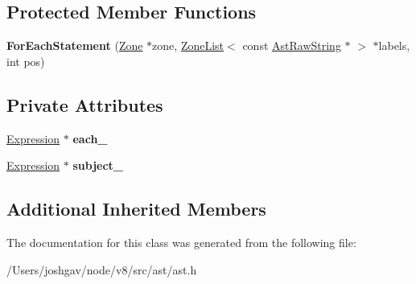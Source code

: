 \subsection*{Protected Member Functions}
\begin{DoxyCompactItemize}
\item 
{\bfseries For\+Each\+Statement} (\hyperlink{classv8_1_1internal_1_1_zone}{Zone} $\ast$zone, \hyperlink{classv8_1_1internal_1_1_zone_list}{Zone\+List}$<$ const \hyperlink{classv8_1_1internal_1_1_ast_raw_string}{Ast\+Raw\+String} $\ast$ $>$ $\ast$labels, int pos)\hypertarget{classv8_1_1internal_1_1_for_each_statement_abf06e12eaae648e6f694c45e1d8e60c9}{}\label{classv8_1_1internal_1_1_for_each_statement_abf06e12eaae648e6f694c45e1d8e60c9}

\end{DoxyCompactItemize}
\subsection*{Private Attributes}
\begin{DoxyCompactItemize}
\item 
\hyperlink{classv8_1_1internal_1_1_expression}{Expression} $\ast$ {\bfseries each\+\_\+}\hypertarget{classv8_1_1internal_1_1_for_each_statement_aa12808d96f7342cf636a60c3d6f512a1}{}\label{classv8_1_1internal_1_1_for_each_statement_aa12808d96f7342cf636a60c3d6f512a1}

\item 
\hyperlink{classv8_1_1internal_1_1_expression}{Expression} $\ast$ {\bfseries subject\+\_\+}\hypertarget{classv8_1_1internal_1_1_for_each_statement_a3b5e40ae9a83c70fe26870e8b87e189c}{}\label{classv8_1_1internal_1_1_for_each_statement_a3b5e40ae9a83c70fe26870e8b87e189c}

\end{DoxyCompactItemize}
\subsection*{Additional Inherited Members}


The documentation for this class was generated from the following file\+:\begin{DoxyCompactItemize}
\item 
/\+Users/joshgav/node/v8/src/ast/ast.\+h\end{DoxyCompactItemize}
